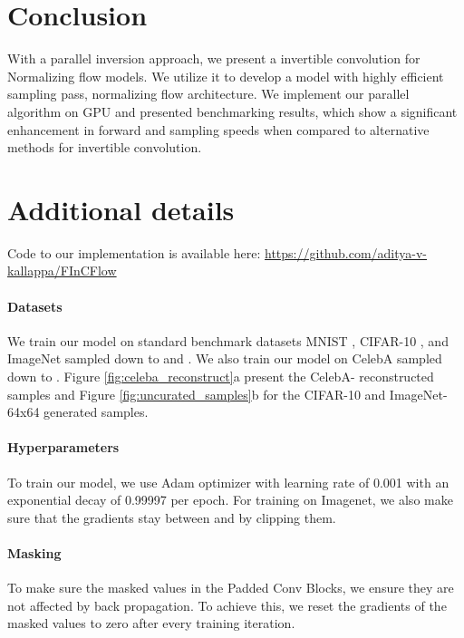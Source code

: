 \documentclass[a4paper,twoside]{article}
\theoremstyle{definition}
\begin{document}
 \section{Conclusion}

With a parallel inversion approach, we present a  invertible convolution for Normalizing flow models. We utilize it to develop a model with highly efficient sampling pass, normalizing flow architecture. We implement our parallel algorithm on GPU and presented benchmarking results, which show a significant enhancement in forward and sampling speeds when compared to alternative methods for  invertible convolution.




%
 






\section*{Additional details}
Code to our implementation is available here:   \url{https://github.com/aditya-v-kallappa/FInCFlow}
\noindent
\paragraph{Datasets}
We train our model on standard benchmark datasets MNIST \citep{deng2012mnist}, CIFAR-10 \citep{krizhevsky2009learning}, and ImageNet \citep{russakovsky2015imagenet} sampled down to  and . We also train our model on CelebA \citep{liu2015deep} sampled down to . Figure \ref{fig:celeba_reconstruct}a present the CelebA- reconstructed samples and Figure \ref{fig:uncurated_samples}b for the CIFAR-10 and ImageNet-64x64 generated samples.

\paragraph{Hyperparameters}
To train our model, we use Adam optimizer \citep{kingma2014adam} with learning rate of 0.001 with an exponential decay of 0.99997 per epoch. For training on Imagenet, we also make sure that the gradients stay between  and  by clipping them. 

\paragraph{Masking}
To make sure the masked values in the Padded Conv Blocks, we ensure they are not affected by back propagation. To achieve this, we reset the gradients of the masked values to zero after every training iteration.
\end{document}
